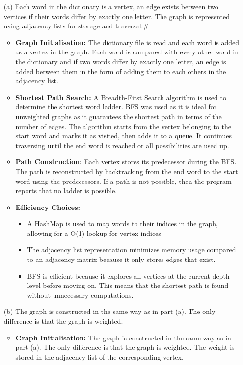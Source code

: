 \documentclass{article}
\begin{document}
\begin{itemize}
\item[(a)] 
Each word in the dictionary is a vertex, an edge exists between two vertices if their words differ by exactly one letter. The graph is represented using adjacency lists for storage and traversal.#
\begin{itemize}
    \item \textbf{Graph Initialisation:} 
    The dictionary file is read and each word is added as a vertex in the graph. Each word is compared with every other word in the dictionary and if two words differ by exactly one letter, an edge is added between them in the form of adding them to each others in the adjacency list. 

    \item \textbf{Shortest Path Search:} 
    A Breadth-First Search algorithm is used to determine the shortest word ladder. BFS was used as it is ideal for unweighted graphs as it guarantees the shortest path in terms of the number of edges. The algorithm starts from the vertex belonging to the start word and marks it as visited, then adds it to a queue. It continues traversing until the end word is reached or all possibilities are used up.

    \item \textbf{Path Construction:} 
    Each vertex stores its predecessor during the BFS. The path is reconstructed by backtracking from the end word to the start word using the predecessors. If a path is not possible, then the program reports that no ladder is possible.

    \item \textbf{Efficiency Choices:} 
    \begin{itemize}
        \item A HashMap is used to map words to their indices in the graph, allowing for a  O(1) lookup for vertex indices.
        \item The adjacency list representation minimizes memory usage compared to an adjacency matrix because it only stores edges that exist.
        \item BFS is efficient because it explores all vertices at the current depth level before moving on. This means that the shortest path is found without unnecessary computations.
    \end{itemize}
\end{itemize}

\item[(b)]
The graph is constructed in the same way as in part (a). The only difference is that the graph is weighted.
\begin{itemize}
    \item \textbf{Graph Initialisation:} 
    The graph is constructed in the same way as in part (a). The only difference is that the graph is weighted. The weight is stored in the adjacency list of the corresponding vertex.


\end{itemize}
\end{itemize}
\end{document}
